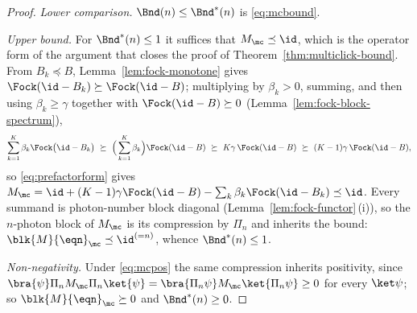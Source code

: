\begin{proof}
\emph{Lower comparison.} $\Bnd(n)\le\Bnd^{\ast}(n)$ is \eqref{eq:mcbound}.

\emph{Upper bound.} For $\Bnd^{\ast}(n)\le1$ it suffices that
$M_{\mc}\preceq\id$, which is the operator form of the argument that closes
the proof of Theorem~\ref{thm:multiclick-bound}. From $B_k\preceq B$,
Lemma~\ref{lem:fock-monotone} gives $\Fock(\id-B_k)\succeq\Fock(\id-B)$;
multiplying by $\beta_k>0$, summing, and then using $\beta_k\ge\gamma$
together with $\Fock(\id-B)\succeq0$ (Lemma~\ref{lem:fock-block-spectrum}),
\begin{equation}\label{eq:mcupper}
  \sum_{k=1}^{K}\beta_k\Fock\big(\id-B_k\big)
  \ \succeq\ \Big(\sum_{k=1}^{K}\beta_k\Big)\Fock(\id-B)
  \ \succeq\ K\gamma\,\Fock(\id-B)
  \ \succeq\ (K-1)\gamma\,\Fock(\id-B) ,
\end{equation}
so \eqref{eq:prefactorform} gives $M_{\mc}=\id+(K-1)\gamma\Fock(\id-B)
-\sum_k\beta_k\Fock(\id-B_k)\preceq\id$. Every summand is photon-number block
diagonal (Lemma~\ref{lem:fock-functor}\,(i)), so the $n$-photon block of
$M_{\mc}$ is its compression by $\Pi_n$ and inherits the bound:
$\blk{M}{\eqn}_{\mc}\preceq\id^{(=n)}$, whence $\Bnd^{\ast}(n)\le1$.

\emph{Non-negativity.} Under \eqref{eq:mcpos} the same compression inherits
positivity, since
$\bra{\psi}\Pi_nM_{\mc}\Pi_n\ket{\psi}=\bra{\Pi_n\psi}M_{\mc}\ket{\Pi_n\psi}
\ge0$ for every $\ket\psi$; so $\blk{M}{\eqn}_{\mc}\succeq0$ and
$\Bnd^{\ast}(n)\ge0$.
\end{proof}
